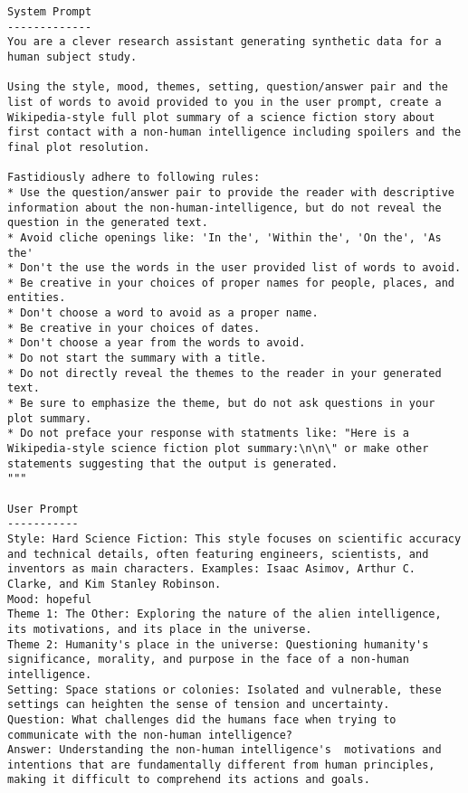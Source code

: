 \begin{prompt}[title={\thetcbcounter: System Prompt + User Prompt example}, label=prompt:scifi]
\begin{lstlisting}
System Prompt
-------------
You are a clever research assistant generating synthetic data for a human subject study.

Using the style, mood, themes, setting, question/answer pair and the list of words to avoid provided to you in the user prompt, create a Wikipedia-style full plot summary of a science fiction story about first contact with a non-human intelligence including spoilers and the final plot resolution. 

Fastidiously adhere to following rules:
* Use the question/answer pair to provide the reader with descriptive information about the non-human-intelligence, but do not reveal the question in the generated text.
* Avoid cliche openings like: 'In the', 'Within the', 'On the', 'As the'
* Don't the use the words in the user provided list of words to avoid.
* Be creative in your choices of proper names for people, places, and entities.
* Don't choose a word to avoid as a proper name.
* Be creative in your choices of dates.
* Don't choose a year from the words to avoid.
* Do not start the summary with a title. 
* Do not directly reveal the themes to the reader in your generated text. 
* Be sure to emphasize the theme, but do not ask questions in your plot summary. 
* Do not preface your response with statments like: "Here is a Wikipedia-style science fiction plot summary:\n\n\" or make other statements suggesting that the output is generated.
"""

User Prompt
-----------
Style: Hard Science Fiction: This style focuses on scientific accuracy and technical details, often featuring engineers, scientists, and inventors as main characters. Examples: Isaac Asimov, Arthur C. Clarke, and Kim Stanley Robinson.
Mood: hopeful
Theme 1: The Other: Exploring the nature of the alien intelligence, its motivations, and its place in the universe.
Theme 2: Humanity's place in the universe: Questioning humanity's significance, morality, and purpose in the face of a non-human intelligence.
Setting: Space stations or colonies: Isolated and vulnerable, these settings can heighten the sense of tension and uncertainty.
Question: What challenges did the humans face when trying to communicate with the non-human intelligence?
Answer: Understanding the non-human intelligence's  motivations and intentions that are fundamentally different from human principles, making it difficult to comprehend its actions and goals. 
\end{lstlisting}
\end{prompt}
\twocolumn


